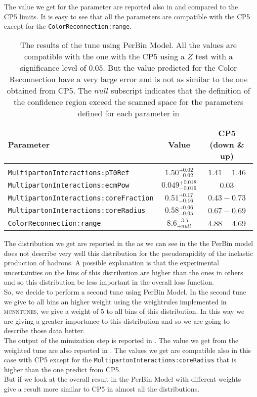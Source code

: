 \noindent The value we get for the parameter are reported also in  and compared to the CP5 limits. 
It is easy to see that all the parameters are compatible with the CP5 except for the \texttt{ColorReconnection:range}. 
\begin{table}[!htb]
\centering
	\begin{tabular}{l | c | c}
		Parameter & Value & CP5 (down \& up)\\ \hline\hline
		\\[-0.85em]		
\texttt{MultipartonInteractions:pT0Ref} & $ 1.50^{+0.02}_{-0.02}$ & $1.41 - 1.46$\\[3pt]
\texttt{MultipartonInteractions:ecmPow} & $ 0.049_{-0.019}^{+0.018} $ & $0.03$\\[3pt]
\texttt{MultipartonInteractions:coreFraction} & $ 0.51_{-0.16}^{+0.17} $ & $0.43 - 0.73$\\[3pt]
\texttt{MultipartonInteractions:coreRadius} & $ 0.58_{-0.05}^{+0.06} $ & $0.67 - 0.69$\\[3pt]
\texttt{ColorReconnection:range} & $ 8.6 ^{-3.5}_{+null} $ & $4.88 - 4.69$\\[2pt]
\end{tabular}
\caption{The results of the tune using PerBin Model. All the values are compatible with the one with the CP5 using a $Z$ test with a significance level of $0.05$. But the value predicted for the Color Reconnection have a very large error and is not as similar to the one obtained from CP5. The $null$ subscript indicates that the definition of the confidence region exceed the scanned space for the parameters defined for each parameter in }
\label{table:result_PerBin_5params}
\end{table}

The distribution we get are reported in the  as we can see in the  the PerBin model does not describe very well this distribution for the pseudorapidity of the inelastic production of hadrons. A possible explanation is that the experimental uncertainties on the bins of this distribution are higher than the ones in others and so this distribution be less important in the overall loss function.
\\
So, we decide to perform a second tune using PerBin Model. In the second tune we give to all  bins an higher weight using the weightrules implemented in \textsc{mcnntunes}, we give a weight of 5 to all bins of this distribution. In this way we are giving a greater importance to this distribution and so we are going to describe those data better.
\\
The output of the mimization step is reported in . 
The value we get from the weighted tune are also reported in . The values we get are compatible also in this case with CP5 except for the \mbox{\texttt{MultipartonInteractions:coreRadius}} that is higher than the one predict from CP5.
\\
But if we look at the overall result in 
the PerBin Model with different weights give a result more similar to CP5 in almost all the distributions. 

